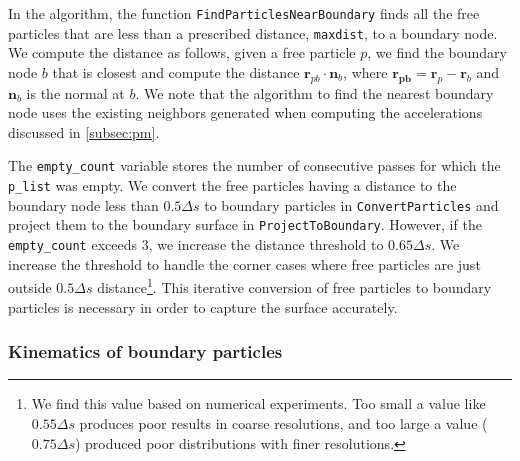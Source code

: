\documentclass[preprint,12pt]{elsarticle}
\newcommand{\ten}[1]{\ensuremath{\mathbf{#1}}}
\newcommand{\code}[1]{\lstinline{#1}}
\begin{document}
\begin{sloppypar}
In the algorithm, the function \lstinline{FindParticlesNearBoundary} finds
all the free particles that are less than a prescribed distance,
\lstinline{maxdist}, to a boundary node. We compute the distance as follows,
given a free particle $p$, we find the boundary node $b$ that is closest and
compute the distance $\ten{r}_{pb} \cdot \ten{n}_b$, where $\ten{r_{pb}} =
\ten{r}_p - \ten{r}_b$ and $\ten{n}_b$ is the normal at $b$. We note that the
algorithm to find the nearest boundary node uses the existing neighbors
generated when computing the accelerations discussed in \cref{subsec:pm}.
\end{sloppypar}

\begin{sloppypar}
The \lstinline{empty_count} variable stores the number of consecutive passes
for which the \lstinline{p_list} was empty. We convert the free particles
having a distance to the boundary node less than $0.5 \Delta s$ to boundary
particles in \code{ConvertParticles} and project them to the boundary surface
in \code{ProjectToBoundary}. However, if the \lstinline{empty_count} exceeds
3, we increase the distance threshold to $0.65 \Delta s$. We increase the
threshold to handle the corner cases where free particles are just outside
$0.5 \Delta s$ distance\footnote{We find this value based on numerical
experiments. Too small a value like $0.55 \Delta s$ produces poor results in
coarse resolutions, and too large a value ($0.75 \Delta s$) produced poor
distributions with finer resolutions.}. This iterative conversion of free
particles to boundary particles is necessary in order to capture the surface
accurately.
\end{sloppypar}

\subsubsection{Kinematics of boundary particles}
\label{subsec:om}
\end{document}
